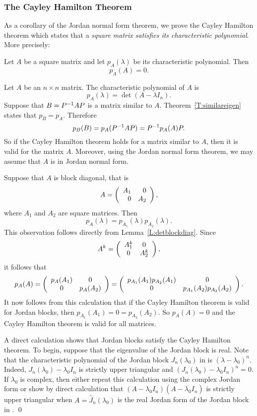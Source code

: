 \subsubsection*{The Cayley Hamilton Theorem}

As a corollary of the Jordan normal form theorem, we prove the Cayley 
Hamilton theorem which states that a {\em square matrix satisfies its 
characteristic polynomial\/}.  More precisely:
\begin{thm} \label{T:CH} 
Let $A$ be a square matrix and let $p_A(\lambda)$ be 
its characteristic polynomial.  Then
\[
p_A(A) = 0.
\]
\end{thm}

\proof  Let $A$ be an $n\times n$ matrix.  The characteristic polynomial of 
$A$ is
\[
p_A(\lambda)=\det(A-\lambda I_n).
\]
Suppose that $B=P^{-1} AP$ is a matrix similar to $A$.  
Theorem~\ref{T:similareigen} states that $p_B=p_A$.  Therefore
\[
p_B(B)= p_A(P^{-1} AP) = P^{-1} p_A(A)P.
\]
So if the Cayley Hamilton theorem holds for a matrix similar to $A$, 
then it is valid for the matrix $A$.  Moreover, using the Jordan normal form 
theorem, we may assume that $A$ is in Jordan normal form.  

Suppose that $A$ is block diagonal, that is 
\[
A = \left(\begin{array}{rr} A_1 & 0\\ 0 &A_2\end{array}\right),
\]
where $A_1$ and $A_2$ are square matrices.  Then 
\[
p_A(\lambda) = p_{A_1}(\lambda)p_{A_2}(\lambda).
\]
This observation follows directly from Lemma~\ref{L:detblockdiag}.  Since
\[
A^k = \left(\begin{array}{cc} A_1^k & 0\\ 0 &A_2^k\end{array}\right),
\]
it follows that 
\[
p_A(A) = \left(\begin{array}{cc} p_A(A_1) & 0\\ 0 &p_A(A_2)\end{array}\right)
 = \left(\begin{array}{cc} p_{A_1}(A_1)p_{A_2}(A_1) & 0\\ 0 &p_{A_1}(A_2)p_{A_2}(A_2)\end{array}\right).
\]
It now follows from this calculation that if the Cayley Hamilton theorem is 
valid for Jordan blocks, then $p_{A_1}(A_1)=0=p_{A_2}(A_2)$.  So $p_A(A)=0$ 
and the Cayley Hamilton theorem is valid for all matrices.

A direct calculation shows that Jordan blocks satisfy the 
Cayley Hamilton theorem.  To begin, suppose that the eigenvalue of the 
Jordan block is real.  Note that the characteristic polynomial of 
the Jordan block $J_n(\lambda_0)$ in  is $(\lambda-\lambda_0)^n$.
Indeed, $J_n(\lambda_0)-\lambda_0I_n$ is strictly upper triangular and 
$(J_n(\lambda_0)-\lambda_0I_n)^n=0$.  If $\lambda_0$ is complex, then either
repeat this calculation using the complex Jordan form or show by direct 
calculation that $(A-\lambda_0I_n)(A-\overline{\lambda_0}I_n)$ is strictly 
upper triangular when $A=\widehat{J}_n(\lambda_0)$ is the real Jordan form of 
the Jordan block in .  \qed




